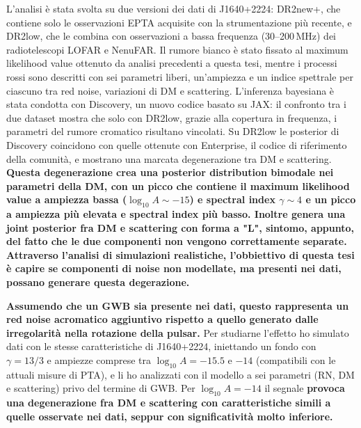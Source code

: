 \documentclass[12pt]{report}
\begin{document}
L'analisi è stata svolta su due versioni dei dati di J1640+2224: DR2new+, che
contiene solo le osservazioni EPTA acquisite con la strumentazione più recente,
e DR2low, che le combina con osservazioni a bassa frequenza (30--200\,MHz) dei
radiotelescopi LOFAR e NenuFAR. Il rumore bianco è stato fissato al maximum likelihood value ottenuto da analisi precedenti a questa tesi, mentre i processi rossi sono descritti
con sei parametri liberi, un'ampiezza e un indice spettrale per ciascuno tra
red noise, variazioni di DM e scattering. L'inferenza bayesiana è stata
condotta con Discovery, un nuovo codice basato su JAX: il confronto tra i due
dataset mostra che solo con DR2low, grazie alla copertura in frequenza, i
parametri del rumore cromatico risultano vincolati. Su DR2low le posterior di
Discovery coincidono con quelle ottenute con Enterprise, il codice di
riferimento della comunità, e mostrano una marcata degenerazione tra DM
e scattering. {\bf Questa degenerazione crea una posterior distribution bimodale nei parametri della DM, con un picco che contiene il maximum likelihood value a ampiezza bassa ($\log_{10}A\sim -15$) e spectral index $\gamma\sim 4$ e un picco a ampiezza più elevata e spectral index più basso. Inoltre genera una joint posterior fra DM e scattering con forma a "L", sintomo, appunto, del fatto che le due componenti non vengono correttamente separate. Attraverso l'analisi di simulazioni realistiche, l'obbiettivo di questa tesi è capire se componenti di noise non modellate, ma presenti nei dati, possano generare questa degerazione.}\par

{\bf Assumendo che un GWB sia presente nei dati, questo rappresenta un red noise acromatico aggiuntivo rispetto a quello generato dalle irregolarità nella rotazione della pulsar.}
Per studiarne l'effetto 
ho simulato dati con le stesse
caratteristiche di J1640+2224, iniettando un fondo con $\gamma = 13/3$ e ampiezze comprese tra $\log_{10}A = -15.5$ e $-14$ (compatibili con le attuali misure di PTA), e li ho analizzati con il
modello a sei parametri (RN, DM e scattering) privo del termine di GWB. Per $\log_{10}A = -14$ il
segnale {\bf provoca una degenerazione fra DM e scattering con caratteristiche simili a quelle osservate nei dati, seppur con significatività molto inferiore.}\par

\end{document}

